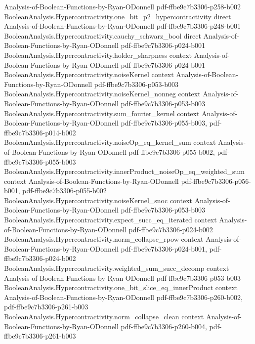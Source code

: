 \begin{lemma}
  {Analysis-of-Boolean-Functions-by-Ryan-ODonnell}
  {pdf-ffbe9c7b3306-p258-b002}
\proofstep
  {BooleanAnalysis.Hypercontractivity.one_bit_p2_hypercontractivity}
  {direct}
  {Analysis-of-Boolean-Functions-by-Ryan-ODonnell}
  {pdf-ffbe9c7b3306-p248-b001}
\proofstep
  {BooleanAnalysis.Hypercontractivity.cauchy_schwarz_bool}
  {direct}
  {Analysis-of-Boolean-Functions-by-Ryan-ODonnell}
  {pdf-ffbe9c7b3306-p024-b001}
\proofstep
  {BooleanAnalysis.Hypercontractivity.holder_sharpness}
  {context}
  {Analysis-of-Boolean-Functions-by-Ryan-ODonnell}
  {pdf-ffbe9c7b3306-p024-b001}
\proofstep
  {BooleanAnalysis.Hypercontractivity.noiseKernel}
  {context}
  {Analysis-of-Boolean-Functions-by-Ryan-ODonnell}
  {pdf-ffbe9c7b3306-p053-b003}
\proofstep
  {BooleanAnalysis.Hypercontractivity.noiseKernel_nonneg}
  {context}
  {Analysis-of-Boolean-Functions-by-Ryan-ODonnell}
  {pdf-ffbe9c7b3306-p053-b003}
\proofstep
  {BooleanAnalysis.Hypercontractivity.sum_fourier_kernel}
  {context}
  {Analysis-of-Boolean-Functions-by-Ryan-ODonnell}
  {pdf-ffbe9c7b3306-p055-b003,
    pdf-ffbe9c7b3306-p014-b002}
\proofstep
  {BooleanAnalysis.Hypercontractivity.noiseOp_eq_kernel_sum}
  {context}
  {Analysis-of-Boolean-Functions-by-Ryan-ODonnell}
  {pdf-ffbe9c7b3306-p055-b002,
    pdf-ffbe9c7b3306-p055-b003}
\proofstep
  {BooleanAnalysis.Hypercontractivity.innerProduct_noiseOp_eq_weighted_sum}
  {context}
  {Analysis-of-Boolean-Functions-by-Ryan-ODonnell}
  {pdf-ffbe9c7b3306-p056-b001,
    pdf-ffbe9c7b3306-p055-b002}
\proofstep
  {BooleanAnalysis.Hypercontractivity.noiseKernel_snoc}
  {context}
  {Analysis-of-Boolean-Functions-by-Ryan-ODonnell}
  {pdf-ffbe9c7b3306-p053-b003}
\proofstep
  {BooleanAnalysis.Hypercontractivity.expect_succ_eq_iterated}
  {context}
  {Analysis-of-Boolean-Functions-by-Ryan-ODonnell}
  {pdf-ffbe9c7b3306-p024-b002}
\proofstep
  {BooleanAnalysis.Hypercontractivity.norm_collapse_rpow}
  {context}
  {Analysis-of-Boolean-Functions-by-Ryan-ODonnell}
  {pdf-ffbe9c7b3306-p024-b001,
    pdf-ffbe9c7b3306-p024-b002}
\proofstep
  {BooleanAnalysis.Hypercontractivity.weighted_sum_succ_decomp}
  {context}
  {Analysis-of-Boolean-Functions-by-Ryan-ODonnell}
  {pdf-ffbe9c7b3306-p053-b003}
\proofstep
  {BooleanAnalysis.Hypercontractivity.one_bit_slice_eq_innerProduct}
  {context}
  {Analysis-of-Boolean-Functions-by-Ryan-ODonnell}
  {pdf-ffbe9c7b3306-p260-b002,
    pdf-ffbe9c7b3306-p261-b003}
\proofstep
  {BooleanAnalysis.Hypercontractivity.norm_collapse_clean}
  {context}
  {Analysis-of-Boolean-Functions-by-Ryan-ODonnell}
  {pdf-ffbe9c7b3306-p260-b004,
    pdf-ffbe9c7b3306-p261-b003}
\proofstep

\end{lemma}
